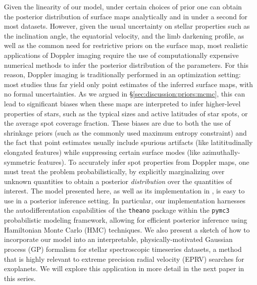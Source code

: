 \documentclass[modern]{aastex631}
\begin{document}
Given the linearity of our model, under certain choices of prior one can obtain the posterior distribution of surface maps analytically and in under a second for most datasets. 
However, given the usual uncertainty on stellar properties such as the inclination angle, the equatorial velocity, and the limb darkening profile, as well as the common need for restrictive priors on the surface map, most realistic applications of Doppler imaging require the use of computationally expensive numerical methods to infer the posterior distribution of the parameters.
For this reason, Doppler imaging is traditionally performed in an optimization setting: most studies thus far yield only point estimates of the inferred surface maps, with no formal uncertainties.
As we argued in \S\ref{sec:discussion:priors:mcmc}, this can lead to significant biases when these maps are interpreted to infer higher-level properties of stars, such as the typical sizes and active latitudes of star spots, or the average spot coverage fraction.
These biases are due to both the use of shrinkage priors (such as the commonly used maximum entropy constraint) and the fact that point estimates usually include spurious artifacts (like latititudinally elongated features) while suppressing certain surface modes (like azimuthally-symmetric features).
To accurately infer spot properties from Doppler maps, one must treat the problem probabilistically, by explicitly marginalizing over unknown quantities to obtain a posterior \emph{distribution} over the quantities of interest.
The model presented here, as well as its implementation in \starry, is easy to use in a posterior inference setting.
In particular, our implementation harnesses the autodifferentation capabilities of the \texttt{theano} \citep{Bergstra2010} package within the \texttt{pymc3} \citep{Salvatier2016} probabilistic modeling framework, allowing for efficient posterior inference using Hamiltonian Monte Carlo (HMC) techniques.
We also present a sketch of how to incorporate our model into an interpretable, physically-motivated Gaussian process (GP) formalism for stellar spectroscopic timeseries datasets, a method that is highly relevant to extreme precision radial velocity (EPRV) searches for exoplanets. We will explore this application in more detail in the next paper in this series.
\end{document}

